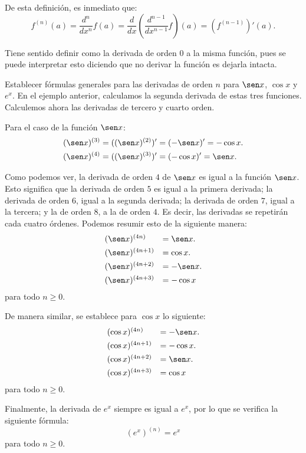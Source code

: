 De esta definición, es inmediato que:
\begin{equation*}
	f^{(n)}(a)=\frac{d^{n}}{d x^{n}}f(a)=
   \frac{d}{d x}\left(\frac{d^{n-1}}{d x^{n-1}}f\right)(a) =
   \left(f^{(n-1)}\right)'(a).
\end{equation*}

Tiene sentido definir como la derivada de orden $0$ a la misma función, pues se puede interpretar
esto diciendo que no derivar la función es dejarla intacta.

\begin{exemplo}[Solución]{%
Establecer fórmulas generales para las derivadas de orden $n$ para $\sen x$, $\cos x$ y
$e^x$.
}%
En el ejemplo anterior, calculamos la segunda derivada de estas tres funciones. Calculemos ahora
las derivadas de tercero y cuarto orden.

Para el caso de la función $\sen x$:
\begin{align*}
(\sen x)^{(3)} &= ((\sen x)^{(2)})' = (-\sen x)' = -\cos x. \\
(\sen x)^{(4)} &= ((\sen x)^{(3)})' = (-\cos x)' = \sen x.
\end{align*}

Como podemos ver, la derivada de orden $4$ de $\sen x$ es igual a la función $\sen x$. Esto
significa que la derivada de orden $5$ es igual a la primera derivada; la derivada de orden $6$,
igual a la segunda derivada; la derivada de orden $7$, igual a la tercera; y la de orden $8$, a la
de orden $4$. Es decir, las derivadas se repetirán cada cuatro órdenes. Podemos resumir esto de la
siguiente manera:
\[
\begin{array}{ll}
(\sen x)^{(4n)} &= \sen x. \\[4pt]
(\sen x)^{(4n+1)} &= \cos x. \\[4pt]
(\sen x)^{(4n + 2)} &= -\sen x. \\[4pt]
(\sen x)^{(4n + 3)} &= -\cos x
\end{array}
\]
para todo $n \geq 0$.

De manera similar, se establece para $\cos x$ lo siguiente:
\[
\begin{array}{ll}
(\cos x)^{(4n)} &= -\sen x. \\[4pt]
(\cos x)^{(4n+1)} &= -\cos x. \\[4pt]
(\cos x)^{(4n + 2)} &= \sen x. \\[4pt]
(\cos x)^{(4n + 3)} &= \cos x
\end{array}
\]
para todo $n \geq 0$.

Finalmente, la derivada de $e^x$ siempre es igual a $e^x$, por lo que se verifica la siguiente
fórmula:
\[
(e^x)^{(n)} = e^x
\]
para todo $n\geq 0$.
\end{exemplo}

